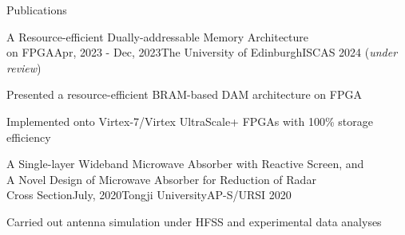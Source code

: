 \documentclass{resume} %
\begin{document}
\begin{rSection}{Publications}

	
	\begin{rSubsection}{A Resource-efficient Dually-addressable Memory Architecture\\on FPGA}{Apr, 2023 - Dec, 2023}{The University of Edinburgh}{ISCAS 2024 (\textit{under review})}
		\item Presented a resource-efficient BRAM-based DAM architecture on FPGA
		\item Implemented onto Virtex-7/Virtex UltraScale+ FPGAs with 100\% storage efficiency
	\end{rSubsection}
	
	\begin{rSubsection}{A Single-layer Wideband Microwave Absorber with Reactive Screen, and\\A Novel Design of Microwave Absorber for Reduction of Radar\\Cross Section}{July, 2020}{Tongji University}{AP-S/URSI 2020}
		\item Carried out antenna simulation under HFSS and experimental data analyses
	\end{rSubsection}

\end{rSection}

\newpage
\end{document}
